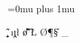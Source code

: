 \makeatletter
{}
{
    \usepackage{etoolbox}

    \Urlmuskip=0mu plus 1mu

    \makeatletter
        \g@addto@macro{\UrlBreaks}{\UrlOrds}
    \makeatother

    \makeatletter
    \g@addto@macro{\UrlBreaks}
    {%
        \do\a\do\b\do\c\do\d\do\e\do\f\do\g%
        \do\h\do\i\do\j\do\k\do\l\do\m\do\n%
        \do\o\do\p\do\q\do\r\do\s\do\t\do\u%
        \do\v\do\w\do\x\do\y\do\z%
        \do\A\do\B\do\C\do\D\do\E\do\F\do\G%
        \do\H\do\I\do\J\do\K\do\L\do\M\do\N%
        \do\O\do\P\do\Q\do\R\do\S\do\T\do\U%
        \do\V\do\W\do\X\do\Y\do\Z%
        \do\/\do\_\do\-%
    }
    \makeatother
}{}
\makeatother





